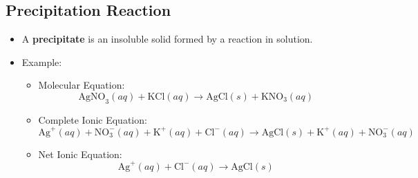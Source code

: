\documentclass[10pt]{article}
\begin{document}
\subsection*{Precipitation Reaction}
\begin{itemize}
    \item A \textbf{precipitate} is an insoluble solid formed by a reaction in solution.
    \item Example:
    \begin{itemize}
        \item Molecular Equation:
        \[\text{AgNO}_3(aq) + \text{KCl}(aq) \longrightarrow \text{AgCl}(s) + \text{KNO}_3(aq)\]
        \item Complete Ionic Equation:
        \[\text{Ag}^+(aq) + \text{NO}_3^-(aq) + \text{K}^+(aq) + \text{Cl}^-(aq) \longrightarrow \text{AgCl}(s) + \text{K}^+(aq) + \text{NO}_3^-(aq)\]
        \item Net Ionic Equation:
        \[\text{Ag}^+(aq) + \text{Cl}^-(aq) \longrightarrow \text{AgCl}(s)\]
    \end{itemize}
\end{itemize}
\end{document}
